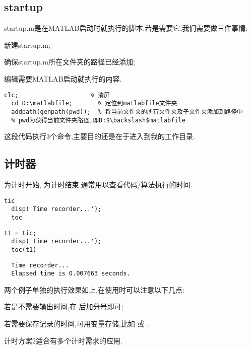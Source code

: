 \subsection{startup}
startup.m是在MATLAB启动时就执行的脚本.若是需要它,我们需要做三件事情:
\begindot
  \item 新建startup.m;
  \item 确保startup.m所在文件夹的路径已经添加;
  \item 编辑需要MATLAB启动就执行的内容.
\myenddot

\vspace{-0.8cm}
\begin{lstlisting}[caption = 我的startup.m]
  clc;                    % 清屏
  cd D:\matlabfile;       % 定位到matlabfile文件夹
  addpath(genpath(pwd));  % 将当前文件夹的所有文件夹及子文件夹添加到路径中
  % pwd为获得当前文件夹路径,即D:$\backslash$matlabfile
\end{lstlisting}
这段代码执行3个命令,主要目的还是在于进入到我的工作目录.



\subsection{计时器}
 为计时开始,  为计时结束.通常用以查看代码/算法执行的时间.

\vspace{-0.8cm}
\begin{lstlisting}[caption = 计时1]
  tic
  disp('Time recorder...');
  toc
\end{lstlisting}

\vspace{-0.8cm}
\begin{lstlisting}[caption=计时2]
  t1 = tic;
  disp('Time recorder...');
  toc(t1)
\end{lstlisting}

\vspace{-0.8cm}
\begin{lstlisting}
  Time recorder...
  Elapsed time is 0.007663 seconds.
\end{lstlisting}

两个例子单独的执行效果如上.在使用时可以注意以下几点:
\begindot
  \item 若是不需要输出时间,在  后加分号即可;
  \item 若需要保存记录的时间,可用变量存储,比如  或  .
  \item 计时方案2适合有多个计时需求的应用.
\myenddot

